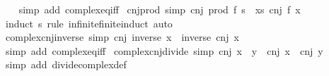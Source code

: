 \begin{isabellebody}
%
\isadelimproof
\ \ %
\endisadelimproof
%
\isatagproof
{}\isamarkupfalse%
\ {\isacharparenleft}{\kern0pt}simp\ add{\isacharcolon}{\kern0pt}\ complex{\isacharunderscore}{\kern0pt}eq{\isacharunderscore}{\kern0pt}iff{\isacharparenright}{\kern0pt}%
\endisatagproof
{\isafoldproof}%
%
\isadelimproof
\isanewline
%
\endisadelimproof
\isanewline
{}\isamarkupfalse%
\ cnj{\isacharunderscore}{\kern0pt}prod\ {\isacharbrackleft}{\kern0pt}simp{\isacharbrackright}{\kern0pt}{\isacharcolon}{\kern0pt}\ {\isachardoublequoteopen}cnj\ {\isacharparenleft}{\kern0pt}prod\ f\ s{\isacharparenright}{\kern0pt}\ {\isacharequal}{\kern0pt}\ {\isacharparenleft}{\kern0pt}{\isasymProd}x{\isasymin}s{\isachardot}{\kern0pt}\ cnj\ {\isacharparenleft}{\kern0pt}f\ x{\isacharparenright}{\kern0pt}{\isacharparenright}{\kern0pt}{\isachardoublequoteclose}\isanewline
%
\isadelimproof
\ \ %
\endisadelimproof
%
\isatagproof
{}\isamarkupfalse%
\ {\isacharparenleft}{\kern0pt}induct\ s\ rule{\isacharcolon}{\kern0pt}\ infinite{\isacharunderscore}{\kern0pt}finite{\isacharunderscore}{\kern0pt}induct{\isacharparenright}{\kern0pt}\ auto%
\endisatagproof
{\isafoldproof}%
%
\isadelimproof
\isanewline
%
\endisadelimproof
\isanewline
{}\isamarkupfalse%
\ complex{\isacharunderscore}{\kern0pt}cnj{\isacharunderscore}{\kern0pt}inverse\ {\isacharbrackleft}{\kern0pt}simp{\isacharbrackright}{\kern0pt}{\isacharcolon}{\kern0pt}\ {\isachardoublequoteopen}cnj\ {\isacharparenleft}{\kern0pt}inverse\ x{\isacharparenright}{\kern0pt}\ {\isacharequal}{\kern0pt}\ inverse\ {\isacharparenleft}{\kern0pt}cnj\ x{\isacharparenright}{\kern0pt}{\isachardoublequoteclose}\isanewline
%
\isadelimproof
\ \ %
\endisadelimproof
%
\isatagproof
{}\isamarkupfalse%
\ {\isacharparenleft}{\kern0pt}simp\ add{\isacharcolon}{\kern0pt}\ complex{\isacharunderscore}{\kern0pt}eq{\isacharunderscore}{\kern0pt}iff{\isacharparenright}{\kern0pt}%
\endisatagproof
{\isafoldproof}%
%
\isadelimproof
\isanewline
%
\endisadelimproof
\isanewline
{}\isamarkupfalse%
\ complex{\isacharunderscore}{\kern0pt}cnj{\isacharunderscore}{\kern0pt}divide\ {\isacharbrackleft}{\kern0pt}simp{\isacharbrackright}{\kern0pt}{\isacharcolon}{\kern0pt}\ {\isachardoublequoteopen}cnj\ {\isacharparenleft}{\kern0pt}x\ {\isacharslash}{\kern0pt}\ y{\isacharparenright}{\kern0pt}\ {\isacharequal}{\kern0pt}\ cnj\ x\ {\isacharslash}{\kern0pt}\ cnj\ y{\isachardoublequoteclose}\isanewline
%
\isadelimproof
\ \ %
\endisadelimproof
%
\isatagproof
{}\isamarkupfalse%
\ {\isacharparenleft}{\kern0pt}simp\ add{\isacharcolon}{\kern0pt}\ divide{\isacharunderscore}{\kern0pt}complex{\isacharunderscore}{\kern0pt}def{\isacharparenright}{\kern0pt}%

\end{isabellebody}
